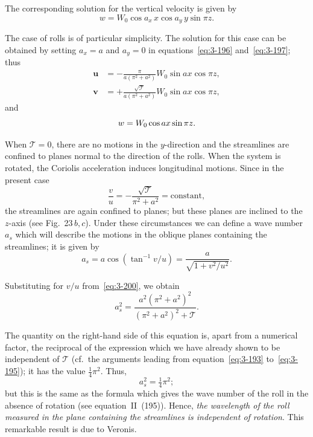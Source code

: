 The corresponding solution for the vertical velocity is given by
\begin{equation}\label{eq:3-197}
w = W_0\cos a_x\, x\cos a_y\, y\sin\pi z.
\end{equation}

The case of rolls is of particular simplicity. The solution for this case can be obtained by setting $a_x = a$ and $a_y = 0$ in equations~\eqref{eq:3-196} and~\eqref{eq:3-197}; thus
\begin{align}
\mathbf{u} &= -\frac{\pi}{a(\pi^2 + a^2)}W_0\sin ax\cos\pi z, \label{eq:3-198}\\
\mathbf{v} &= +\frac{\sqrt{\mathscr{T}}}{a(\pi^2 + a^2)}W_0\sin ax\cos\pi z, \label{eq:3-199}
\end{align}
and
\begin{equation}
w = W_0\cos ax\sin\pi z. \notag
\end{equation}

When $\mathscr{T} = 0$, there are no motions in the $y$-direction and the streamlines are confined to planes normal to the direction of the rolls. When the system is rotated, the Coriolis acceleration induces longitudinal motions. Since in the present case
\begin{equation}\label{eq:3-200}
\frac{v}{u} = -\frac{\sqrt{\mathscr{T}}}{\pi^2 + a^2} = \text{constant},
\end{equation}
the streamlines are again confined to planes; but these planes are inclined to the $z$-axis (see Fig.~23\,$b,c$). Under these circumstances we can define a wave number $a_s$ which will describe the motions in the oblique planes containing the streamlines; it is given by
\begin{equation}\label{eq:3-201}
a_s = a\cos(\tan^{-1} v/u) = \frac{a}{\sqrt{1+v^2/u^2}}.
\end{equation}

Substituting for $v/u$ from~\eqref{eq:3-200}, we obtain
\begin{equation}\label{eq:3-202}
a_s^2 = \frac{a^2(\pi^2 + a^2)^2}{(\pi^2 + a^2)^2 + \mathscr{T}}.
\end{equation}


The quantity on the right-hand side of this equation is, apart from a numerical factor, the reciprocal of the expression which we have already shown to be independent of $\mathscr{T}$ (cf.\ the arguments leading from equation~\eqref{eq:3-193} to~\eqref{eq:3-195}); it has the value $\frac{1}{4}\pi^2$. Thus,
\begin{equation}\label{eq:3-203}
a_s^2 = \tfrac{1}{4}\pi^2;
\end{equation}
but this is the same as the formula which gives the wave number of the roll in the absence of rotation (see equation~II~(195)). Hence, \emph{the wavelength of the roll measured in the plane containing the streamlines is independent of rotation}. This remarkable result is due to Veronis.


